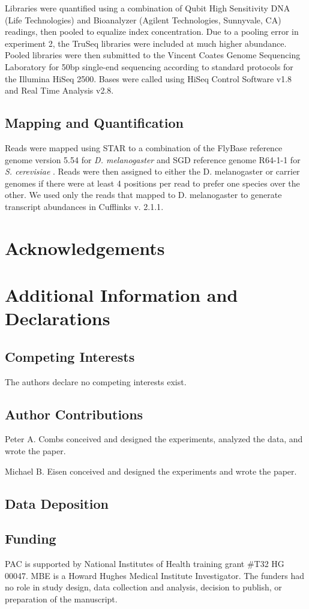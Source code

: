\documentclass[12pt]{article}
\begin{document}
Libraries were quantified using a combination of Qubit High Sensitivity DNA (Life Technologies) and Bioanalyzer (Agilent Technologies, Sunnyvale, CA) readings, then pooled to equalize index concentration. Due to a pooling error in experiment 2, the TruSeq libraries were included at much higher abundance. Pooled libraries were then submitted to the Vincent Coates Genome Sequencing Laboratory for 50bp single-end sequencing according to standard protocols for the Illumina HiSeq 2500. Bases were called using HiSeq Control Software v1.8 and Real Time Analysis v2.8.

\subsection{Mapping and Quantification}

Reads were mapped using STAR \cite{Dobin:2012fg} to a combination of the FlyBase reference genome version 5.54 for {\em D. melanogaster} and SGD reference genome R64-1-1 for {\em S. cerevisiae} \cite{McQuilton:2011iq,Cherry:2012kb}. Reads were then assigned to either the D. melanogaster or carrier genomes if there were at least 4 positions per read to prefer one species over the other. We used only the reads that mapped to D. melanogaster to generate transcript abundances in Cufflinks v. 2.1.1\cite{Roberts:2012kp}.


\section{Acknowledgements}

\section{Additional Information and Declarations}
\subsection{Competing Interests}
The authors declare no competing interests exist.

\subsection{Author Contributions}
Peter A. Combs conceived and designed the experiments, analyzed the data, and wrote the paper.

Michael B. Eisen conceived and designed the experiments and wrote the paper.

\subsection{Data Deposition}

\subsection{Funding}
PAC is supported by National Institutes of Health training grant \#T32 HG 00047. MBE is a Howard Hughes Medical Institute Investigator. The funders had no role in study design, data collection and analysis, decision to publish, or preparation of the manuscript.


\end{document}
